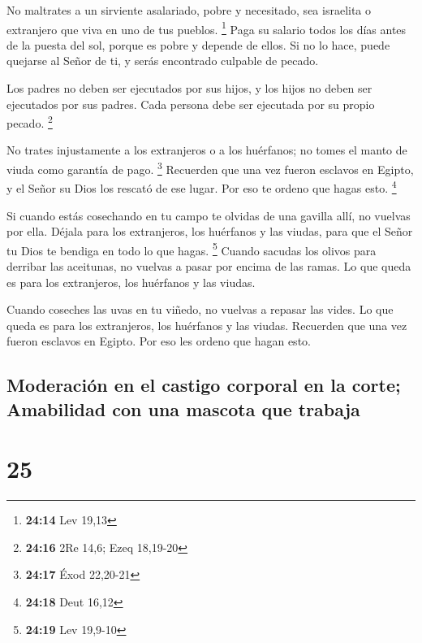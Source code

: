  No maltrates a un sirviente asalariado, pobre y
necesitado, sea israelita o extranjero que viva en uno de tus pueblos.
\footnote{\textbf{24:14} Lev 19,13}  Paga su salario
todos los días antes de la puesta del sol, porque es pobre y depende de
ellos. Si no lo hace, puede quejarse al Señor de ti, y serás encontrado
culpable de pecado.

 Los padres no deben ser ejecutados por sus hijos, y los
hijos no deben ser ejecutados por sus padres. Cada persona debe ser
ejecutada por su propio pecado. \footnote{\textbf{24:16} 2Re 14,6; Ezeq
  18,19-20}

 No trates injustamente a los extranjeros o a los
huérfanos; no tomes el manto de viuda como garantía de pago. \footnote{\textbf{24:17}
  Éxod 22,20-21}  Recuerden que una vez fueron esclavos
en Egipto, y el Señor su Dios los rescató de ese lugar. Por eso te
ordeno que hagas esto. \footnote{\textbf{24:18} Deut 16,12}

 Si cuando estás cosechando en tu campo te olvidas de una
gavilla allí, no vuelvas por ella. Déjala para los extranjeros, los
huérfanos y las viudas, para que el Señor tu Dios te bendiga en todo lo
que hagas. \footnote{\textbf{24:19} Lev 19,9-10}  Cuando
sacudas los olivos para derribar las aceitunas, no vuelvas a pasar por
encima de las ramas. Lo que queda es para los extranjeros, los huérfanos
y las viudas.

 Cuando coseches las uvas en tu viñedo, no vuelvas a
repasar las vides. Lo que queda es para los extranjeros, los huérfanos y
las viudas.  Recuerden que una vez fueron esclavos en
Egipto. Por eso les ordeno que hagan esto.

\hypertarget{moderaciuxf3n-en-el-castigo-corporal-en-la-corte-amabilidad-con-una-mascota-que-trabaja}{%
\subsection{Moderación en el castigo corporal en la corte; Amabilidad
con una mascota que
trabaja}\label{moderaciuxf3n-en-el-castigo-corporal-en-la-corte-amabilidad-con-una-mascota-que-trabaja}}

\hypertarget{section-24}{%
\section{25}\label{section-24}}


